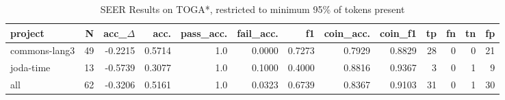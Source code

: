 \begin{table*}
\centering
\caption{SEER Results on TOGA*, restricted to minimum 95\% of tokens present}
\label{tab:toga_results_05}
\begin{tabular}{lrrrrrrrrrrrr}
\toprule
       project &   N &  acc\_$\Delta$ &    acc. &  pass\_acc. &  fail\_acc. &      f1 &  coin\_acc. &  coin\_f1 &  tp &  fn &  tn &  fp \\
\midrule
 commons-lang3 &  49 &     -0.2215 &  0.5714 &        1.0 &     0.0000 &  0.7273 &     0.7929 &   0.8829 &  28 &   0 &   0 &  21 \\
     joda-time &  13 &     -0.5739 &  0.3077 &        1.0 &     0.1000 &  0.4000 &     0.8816 &   0.9367 &   3 &   0 &   1 &   9 \\
           all &  62 &     -0.3206 &  0.5161 &        1.0 &     0.0323 &  0.6739 &     0.8367 &   0.9103 &  31 &   0 &   1 &  30 \\
\bottomrule
\end{tabular}
\end{table*}
